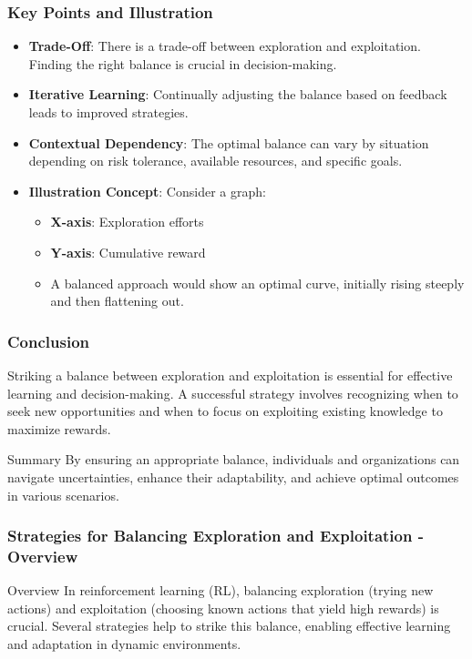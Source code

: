 \documentclass[aspectratio=169]{beamer}
\begin{document}
\begin{frame}[fragile]
    \frametitle{Key Points and Illustration}
    \begin{itemize}
        \item \textbf{Trade-Off}: 
        There is a trade-off between exploration and exploitation. Finding the right balance is crucial in decision-making.
        
        \item \textbf{Iterative Learning}: 
        Continually adjusting the balance based on feedback leads to improved strategies.

        \item \textbf{Contextual Dependency}: 
        The optimal balance can vary by situation depending on risk tolerance, available resources, and specific goals.
        
        \item \textbf{Illustration Concept}:
        Consider a graph:
        \begin{itemize}
            \item \textbf{X-axis}: Exploration efforts
            \item \textbf{Y-axis}: Cumulative reward
            \item A balanced approach would show an optimal curve, initially rising steeply and then flattening out.
        \end{itemize}
    \end{itemize}
\end{frame}

\begin{frame}[fragile]
    \frametitle{Conclusion}
    Striking a balance between exploration and exploitation is essential for effective learning and decision-making. A successful strategy involves recognizing when to seek new opportunities and when to focus on exploiting existing knowledge to maximize rewards.

    \begin{block}{Summary}
        By ensuring an appropriate balance, individuals and organizations can navigate uncertainties, enhance their adaptability, and achieve optimal outcomes in various scenarios.
    \end{block}
\end{frame}

\begin{frame}[fragile]
    \frametitle{Strategies for Balancing Exploration and Exploitation - Overview}
    \begin{block}{Overview}
        In reinforcement learning (RL), balancing exploration (trying new actions) and exploitation (choosing known actions that yield high rewards) is crucial. 
        Several strategies help to strike this balance, enabling effective learning and adaptation in dynamic environments.
    \end{block}
\end{frame}
\end{document}

